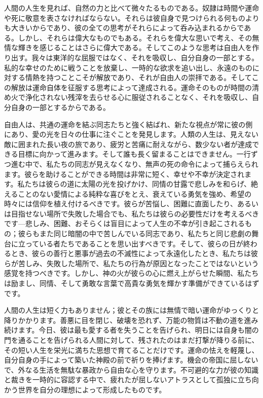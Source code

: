 \documentclass[a4paper,11pt,openany]{ltjsbook}
\begin{document}
人間の人生を見れば、自然の力と比べて微々たるものである。奴隷は時間や運命や死に敬意を表さなければならない。それらは彼自身で見つけられる何ものよりも大きいからであり、彼の全ての思考がそれらによって呑み込まれるからである。しかし、それらは偉大なものでもある。それらを偉大な思いで考え、その無情な輝きを感じることはさらに偉大である。そしてこのような思考は自由人を作り出す。我々は東洋的な屈服ではなく、それを吸収し、自分自身の一部とする。私的な幸せのために戦うことを放棄し、一時的な欲求を追い出し、永遠のものに対する情熱を持つことこそが解放であり、それが自由人の崇拝である。そしてこの解放は運命自体を征服する思考によって達成される。運命そのものが時間の清め火で浄化されない残滓を去らせる心に服従されることなく、それを吸収し、自分自身の一部とするからである。

自由人は、共通の運命を結ぶ同志たちと強く結ばれ、新たな視点が常に彼の側にあり、愛の光を日々の仕事に注ぐことを発見します。人類の人生は、見えない敵に囲まれた長い夜の旅であり、疲労と苦痛に耐えながら、数少ない者が達成できる目標に向かって進みます。そして誰も長く留まることはできません。一行ずつ進む中で、私たちの同志が見えなくなり、無声の死の命令によって捕らえられます。彼らを助けることができる時間は非常に短く、幸せや不幸が決定されます。私たちは彼らの道に太陽の光を投げかけ、同情の甘露で悲しみを和らげ、絶えることのない愛情による純粋な喜びをとえ、衰えている勇気を強め、希望の時々には信仰を植え付けるべきです。彼らが苦悩し、困難に直面したり、あるいは目指せない場所で失敗した場合でも、私たちは彼らの必要性だけを考えるべきです—悲しみ、困難、おそらくは盲目によって人生の不幸が引き起こされるもの；彼らもまた同じ暗闇の中で苦しんでいる同志であり、私たちと同じ悲劇の舞台に立っている者たちであることを思い出すべきです。そして、彼らの日が終わるとき、彼らの善行と悪事が過去の不滅性によって永遠化したとき、私たちは彼らが苦しみ、失敗した場所で、私たちの行為が原因となったことではないという感覚を持つべきです。しかし、神の火が彼らの心に燃え上がらせた瞬間、私たちは励まし、同情、そして勇敢な言葉で高貴な勇気を輝かす準備ができているはずです。

人間の人生は短く力もありません；彼とその族には無情で暗い運命がゆっくりと降りかかります。善悪に目を閉じ、破壊を恐れず、万能の物質は不動の道を進み続けます。今日、彼は最も愛する者を失うことを告げられ、明日には自身も闇の門を通ることを告げられる人間に対して、残されたのはまだ打撃が降りる前に、その短い人生を栄光に満ちた思想で育てることだけです。運命の怯えを軽蔑し、自分自身の手によって築いた神殿の前で祈りを捧げます。機会の帝国に屈しないで、外なる生活を無駄な暴政から自由な心を守ります。不可避的な力が彼の知識と裁きを一時的に容認する中で、疲れたが屈しないアトラスとして孤独に立ち向かう世界を自分の理想によって形成したものです。
\end{document}
